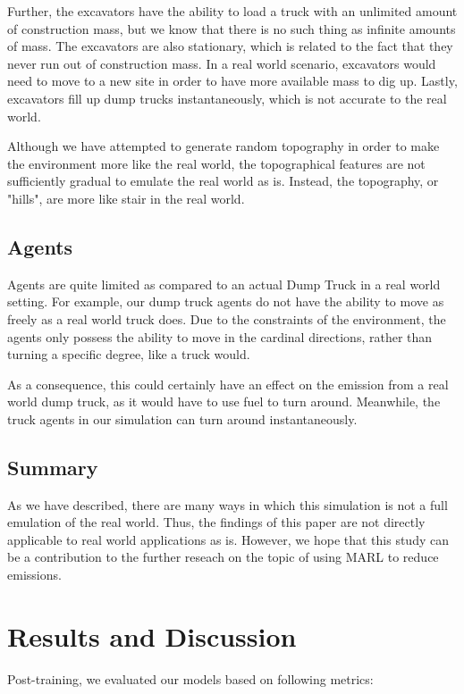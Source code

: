 \documentclass[conference]{IEEEtran}
\begin{document}
	Further, the excavators have the ability to load a truck with an unlimited amount of construction mass,
	but we know that there is no such thing as infinite amounts of mass. The excavators are also stationary,
	which is related to the fact that they never run out of construction mass. In a real world scenario,
	excavators would need to move to a new site in order to have more available mass to dig up. Lastly,
	excavators fill up dump trucks instantaneously, which is not accurate to the real world.

	Although we have attempted to generate random topography in order to make the environment more like
	the real world, the topographical features are not sufficiently gradual to emulate the real world as is.
	Instead, the topography, or "hills", are more like stair in the real world.


	\subsection{Agents}
	Agents are quite limited as compared to an actual Dump Truck in a real world setting. For example,
	our dump truck agents do not have the ability to move as freely as a real world truck does. Due to the
	constraints of the environment, the agents only possess the ability to move in the cardinal directions,
	rather than turning a specific degree, like a truck would.

	As a consequence, this could certainly have an effect on the emission from a real world dump truck, as
	it would have to use fuel to turn around. Meanwhile, the truck agents in our simulation can turn around
	instantaneously.


	\subsection{Summary}
	As we have described, there are many ways in which this simulation is not a full emulation of the
	real world. Thus, the findings of this paper are not directly applicable to real world applications
	as is. However, we hope that this study can be a contribution to the further reseach on the topic of
	using MARL to reduce emissions.


	\section{Results and Discussion}
	Post-training, we evaluated our models based on following metrics:
\end{document}
